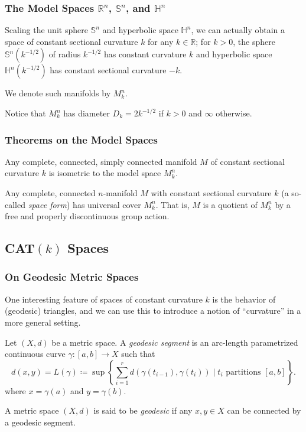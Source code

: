 \documentclass[handout]{beamer}
\newcommand{\Sp}{\mathbb{S}}
\newcommand{\Hy}{\mathbb{H}}
\newcommand{\R}{\mathbb{R}}
\theoremstyle{definition}
\begin{document}
\begin{frame}
    \frametitle{The Model Spaces $\R^n$, $\Sp^n$, and $\Hy^n$}

    \pause
    Scaling the unit sphere $\Sp^n$ and hyperbolic space $\Hy^n$, we can
    actually obtain a space of constant sectional curvature $k$ for any
    $k \in \R$; for $k > 0$, the sphere $\Sp^n(k^{-1/2})$ of radius
    $k^{-1/2}$ has constant curvature $k$ and hyperbolic space
    $\Hy^n(k^{-1/2})$ has constant sectional curvature $-k$.

    \pause
    We denote such manifolds by $M_k^n$.

    Notice that $M_k^n$ has diameter $D_k = 2k^{-1/2}$ if $k > 0$ and
    $\infty$ otherwise.

\end{frame}

\begin{frame}
    \frametitle{Theorems on the Model Spaces}

    \pause
    \begin{theorem}
        Any complete, connected, simply connected manifold $M$ of constant sectional
        curvature $k$ is isometric to the model space $M_k^n$.
    \end{theorem}

    \pause
    \begin{theorem}
        Any complete, connected $n$-manifold $M$ with constant sectional curvature $k$
        (a so-called \emph{space form}) has universal cover $M_k^n$.
        That is, $M$ is a quotient of $M_k^n$ by a free and properly discontinuous
        group action.
    \end{theorem}
\end{frame}

\subsection{CAT$(k)$ Spaces}

\begin{frame}
    \frametitle{On Geodesic Metric Spaces}

    \pause
    One interesting feature of spaces of constant curvature $k$ is the behavior
    of (geodesic) triangles, and we can use this to introduce a notion of ``curvature''
    in a more general setting.

    \pause
    \begin{definition}
        Let $(X,d)$ be a metric space. A \emph{geodesic segment} is an arc-length parametrized
        continuous curve $\gamma : [a,b] \to X$ such that
        \[
          d(x,y) = L(\gamma)
          \coloneqq \sup\left\{\sum_{i=1}^r d(\gamma(t_{i-1}),\gamma(t_i))
          \mid t_i \text{ partitions } [a,b] \right\}.
        \]
        where $x = \gamma(a)$ and $y = \gamma(b)$.

        \pause
        A metric space $(X,d)$ is said to be \emph{geodesic} if any $x, y \in X$ can be connected
        by a geodesic segment.
    \end{definition}

\end{frame}
\end{document}
